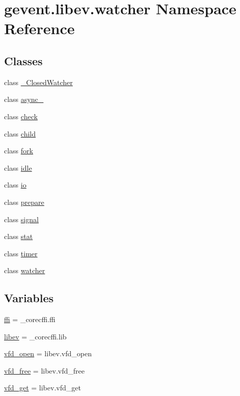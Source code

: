 \hypertarget{namespacegevent_1_1libev_1_1watcher}{}\section{gevent.\+libev.\+watcher Namespace Reference}
\label{namespacegevent_1_1libev_1_1watcher}
\subsection*{Classes}
\begin{DoxyCompactItemize}
\item 
class \hyperlink{classgevent_1_1libev_1_1watcher_1_1___closed_watcher}{\+\_\+\+Closed\+Watcher}
\item 
class \hyperlink{classgevent_1_1libev_1_1watcher_1_1async__}{async\+\_\+}
\item 
class \hyperlink{classgevent_1_1libev_1_1watcher_1_1check}{check}
\item 
class \hyperlink{classgevent_1_1libev_1_1watcher_1_1child}{child}
\item 
class \hyperlink{classgevent_1_1libev_1_1watcher_1_1fork}{fork}
\item 
class \hyperlink{classgevent_1_1libev_1_1watcher_1_1idle}{idle}
\item 
class \hyperlink{classgevent_1_1libev_1_1watcher_1_1io}{io}
\item 
class \hyperlink{classgevent_1_1libev_1_1watcher_1_1prepare}{prepare}
\item 
class \hyperlink{classgevent_1_1libev_1_1watcher_1_1signal}{signal}
\item 
class \hyperlink{classgevent_1_1libev_1_1watcher_1_1stat}{stat}
\item 
class \hyperlink{classgevent_1_1libev_1_1watcher_1_1timer}{timer}
\item 
class \hyperlink{classgevent_1_1libev_1_1watcher_1_1watcher}{watcher}
\end{DoxyCompactItemize}
\subsection*{Variables}
\begin{DoxyCompactItemize}
\item 
\hyperlink{namespacegevent_1_1libev_1_1watcher_a5675878ea69817167e0c3ab2dce6b419}{ffi} = \+\_\+corecffi.\+ffi
\item 
\hyperlink{namespacegevent_1_1libev_1_1watcher_af7be15afa690b286253eb4c590187580}{libev} = \+\_\+corecffi.\+lib
\item 
\hyperlink{namespacegevent_1_1libev_1_1watcher_ac0300e43caf88f6660cc14a16249d776}{vfd\+\_\+open} = libev.\+vfd\+\_\+open
\item 
\hyperlink{namespacegevent_1_1libev_1_1watcher_a18e01cb8ede7878835f776c7e5e6a852}{vfd\+\_\+free} = libev.\+vfd\+\_\+free
\item 
\hyperlink{namespacegevent_1_1libev_1_1watcher_a36552a53b6da7acaa594730d3e6fd322}{vfd\+\_\+get} = libev.\+vfd\+\_\+get
\end{DoxyCompactItemize}


